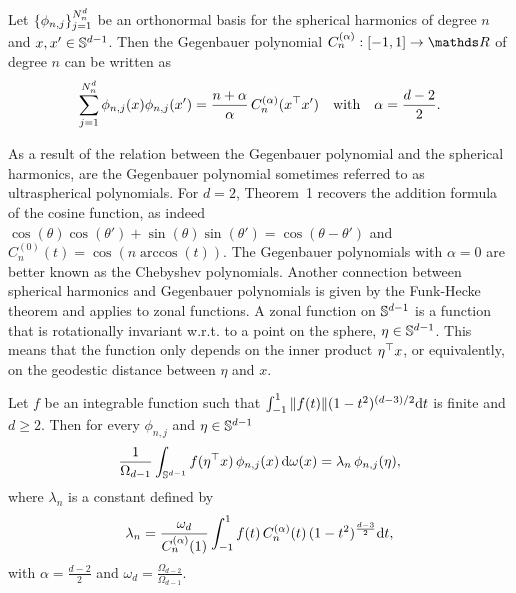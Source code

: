 \begin{theorem}[Addition]
    \label{theorem:addition}
    Let $\{\phi_{n,j}\}_{j=1}^{N^d_n}$ be an orthonormal basis for the spherical harmonics of degree $n$ and $x,x' \in \mathbb{S}^{d-1}$. Then the Gegenbauer polynomial $C_n^{(\alpha)}: [-1, 1] \rightarrow \Reals$ of degree $n$ can be written as
\begin{equation}
    \sum_{j=1}^{N^d_n} \phi_{n, j}(x) \phi _{n, j}(x') = \frac{n + \alpha}{\alpha}\,
    C_n^{(\alpha)}(x^{\top} x')\quad\text{with}\quad \alpha = \frac{d-2}{2}.
\end{equation}
\end{theorem}
As a result of the relation between the Gegenbauer polynomial and the spherical harmonics, are the Gegenbauer polynomial sometimes referred to as ultraspherical polynomials. For $d=2$, Theorem~1 recovers the addition formula of the cosine function, as indeed $\cos(\theta) \cos(\theta') + \sin(\theta) \sin(\theta') = \cos(\theta - \theta')$ and $C_n^{(0)}(t) = \cos(n \arccos(t))$. The Gegenbauer polynomials with $\alpha=0$ are better known as the Chebyshev polynomials. Another connection between spherical harmonics and Gegenbauer polynomials is given by the Funk-Hecke theorem and applies to zonal functions. A zonal function on $\mathbb{S}^{d-1}$ is a function that is rotationally invariant w.r.t. to a point on the sphere, $\eta \in \mathbb{S}^{d-1}$. This means that the function only depends on the inner product $\eta^{\top} x$, or equivalently, on the geodestic distance between $\eta$ and $x$.

\begin{theorem}
    Let $f$ be an integrable function such that $\int_{-1}^1 \| f(t)\| (1 - t^2)^{(d-3)/2} \mathrm{d}{t}$ is finite and $d \ge 2$. Then for every $\phi_{n,j}$  and $\eta \in \mathbb{S}^{d-1}$
    \begin{equation}
        \frac{1}{\Omega_{d-1}} \int_{\mathbb{S}^{d-1}} f(\eta^{\top} x)\,\phi_{n, j}(x)\, \mathrm{d}{\omega(x)} = {\lambda}_{n}\,\phi_{n,j}(\eta),
    \end{equation}
    where ${\lambda}_{n}$ is a constant defined by
    \begin{equation}
        \lambda_{n}  = 
        \frac{\omega_{d}}{C_n^{(\alpha)}(1)} \int_{-1}^1 f(t)\,C_n^{(\alpha)}(t)\,(1 - t^2)^{\frac{d-3}{2}} \mathrm{d}{t},
    \end{equation}
    with $\alpha = \frac{d-2}{2}$ and $\omega_d = \frac{\Omega_{d-2}}{\Omega_{d-1}}$.
\end{theorem}

